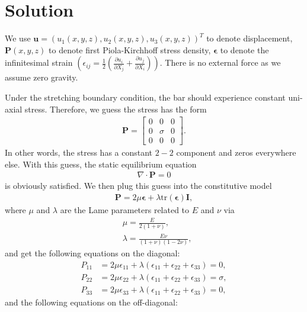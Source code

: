 \documentclass[a4paper]{article}
\newcommand{\mb}[1]{{\mathbf{#1}}}
\newcommand{\II}{\mb{I}}
\newcommand{\PP}{\mb{P}}
\newcommand{\uu}{\mb{u}}
\newcommand{\eepsilon}{\boldsymbol{\epsilon}}
\begin{document}
\section{Solution}
We use $\uu = (u_1(x,y,z), u_2(x,y,z), u_3(x,y,z))^T$ to denote displacement,
$\PP(x,y,z)$ to denote first Piola-Kirchhoff stress density, $\eepsilon$ to
denote the infinitesimal strain $\left(\epsilon_{ij} = \frac{1}{2}
    (\frac{\partial u_i}{\partial X_j} + \frac{\partial u_j}{\partial
      X_i})\right)$.
There is no external force as we assume zero gravity.

Under the stretching boundary condition, the bar should experience constant
uni-axial stress. Therefore, we guess the stress has the form
\begin{align*}
  \PP
  =
  \begin{bmatrix}
    0 & 0 & 0 \\
    0 & \sigma & 0 \\
    0 & 0 & 0
  \end{bmatrix}.
\end{align*}
In other words, the stress has a constant $2-2$ component and zeros everywhere
else.
With this guess, the static equilibrium equation
\begin{align*}
  \nabla \cdot \PP = 0
\end{align*}
is obviously satisfied.
We then plug this guess into the constitutive model
\begin{align*}
  \PP = 2\mu \eepsilon + \lambda \text{tr}(\eepsilon) \II,
\end{align*}
where $\mu$ and $\lambda$ are the Lame parameters related to $E$ and $\nu$ via
\begin{align}
   & \mu = \frac{E}{2(1+\nu)},\label{eq:lame1}               \\
   & \lambda = \frac{E\nu}{(1+\nu)(1-2\nu)}\label{eq:lame2},
\end{align}
and get the following equations on the diagonal:
\begin{align}
  P_{11} & = 2\mu\epsilon_{11} + \lambda(\epsilon_{11} + \epsilon_{22} +
  \epsilon_{33}) = 0 \label{eq:P11},                                     \\
  P_{22} & = 2\mu\epsilon_{22} + \lambda(\epsilon_{11} + \epsilon_{22} +
  \epsilon_{33}) = \sigma \label{eq:P22},                                \\
  P_{33} & = 2\mu\epsilon_{33} + \lambda(\epsilon_{11} + \epsilon_{22} +
  \epsilon_{33}) = 0\label{eq:P33},
\end{align}
and the following equations on the off-diagonal:
\end{document}
